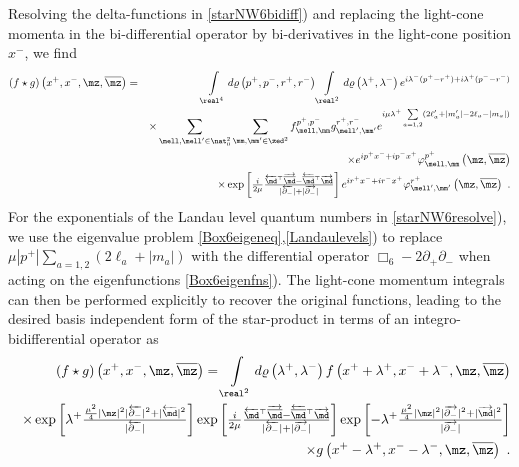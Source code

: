 Resolving the delta-functions in \eqref{starNW6bidiff}) and replacing
the light-cone momenta in the bi-differential operator by
bi-derivatives in the light-cone position $x^-$, we find
\begin{eqnarray}
(f\star g)\left(x^+,x^-,\mz,\overline{\mz} \right)&=&
\int\limits_{\real^4} d\varrho\left(p^+,p^-,r^+,r^-\right) 
\int\limits_{\real^2}
 d\varrho\left(\lambda^+,\lambda^-\right)  e^{ i\lambda^-(p^+-r^+)+
 i\lambda^+(p^--r^-)}\nonumber\\ &&\times 
\sum_{\mell,\mell'\in\nat_0^2} \sum_{\mm,\mm'\in\zed^2}
f_{\mell,\mm}^{p^+,p^-} g_{\mell',\mm'}^{r^+,r^-} 
 e^{ i\mu \lambda^+ \sum\limits_{a=1,2}
(2\ell_a'+|m_a'|-2\ell_a-|m_a|)}\nonumber\\ &&\times 
 e^{ i p^+x^-+ i p^-x^+} \varphi_{\mell,\mm}^{p^+}
\left(\mz,\overline{\mz} \right)\nonumber\\ &&\times 
\exp\left[\mbox{$\frac i{2\mu}$} 
\mbox{$\frac{\overleftarrow{\md}{}^{ \top} 
\overrightarrow{\overline{\md}}
-\overleftarrow{\overline{\md}}{}^{ \top} 
\overrightarrow{\md}}{|\overleftarrow{\partial_-}|+
|\overrightarrow{\partial_-}|}$}\right]  e^{ i r^+x^-+ i r^-x^+} 
\varphi_{\mell',\mm'}^{r^+}\left(\mz,\overline{\mz} \right) \ .
\label{starNW6resolve}\end{eqnarray}
For the exponentials of the Landau level quantum numbers in
\eqref{starNW6resolve}), we use the eigenvalue problem
\eqref{Box6eigeneq},\ref{Landaulevels}) to replace
$\mu |p^+| \sum_{a=1,2}(2\ell_a+|m_a|)$ with the differential
operator $\Box_6-2 \partial_+ \partial_-$ when acting on the
eigenfunctions \eqref{Box6eigenfns}). The
light-cone momentum integrals can then be performed explicitly to
recover the original functions, leading to the desired basis
independent form of the star-product in terms of an
integro-bidifferential operator as
\begin{eqnarray}
&&(f\star g)\left(x^+,x^-,\mz,\overline{\mz} \right) = 
\int\limits_{\real^2} d\varrho\left(\lambda^+,\lambda^-\right) 
f\left(x^++\lambda^+,x^-+\lambda^-,\mz,\overline{\mz} \right)
\nonumber\\ &&               \times \exp\left[\lambda^+ 
\mbox{$\frac{\frac{\mu^2}4 |\mz|^2 
|\overleftarrow{\partial_-}|^{2}+|\overleftarrow{\md}|^2}
{|\overleftarrow{\partial_-}|}$}\right]
\exp\left[\mbox{$\frac i{2\mu}$} 
\mbox{$\frac{\overleftarrow{\md}{}^{ \top} 
\overrightarrow{\overline{\md}}
-\overleftarrow{\overline{\md}}{}^{ \top} 
\overrightarrow{\md}}{|\overleftarrow{\partial_-}|+
|\overrightarrow{\partial_-}|}$}\right] 
\exp\left[-\lambda^+ \mbox{$\frac{\frac{\mu^2}4 |\mz|^2 
|\overrightarrow{\partial_-}|^{2}+|\overrightarrow{\md}|^2}
{|\overrightarrow{\partial_-}|}$}\right]
\nonumber\\ &&               \times 
g\left(x^+-\lambda^+,x^--\lambda^-,\mz,\overline{\mz} \right) \ .
\label{starNW6final}\end{eqnarray}
